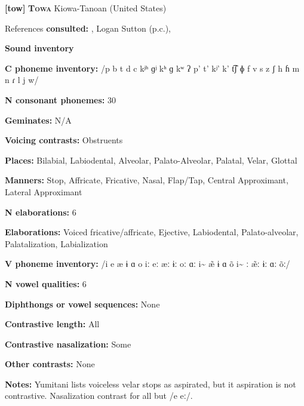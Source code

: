 \textbf{[tow]}   \textbf{\textsc{Towa}  }  Kiowa-Tanoan (United States)



References \textbf{consulted:} \citet{Bell1993}, Logan Sutton (p.c.), \citet{Yumitani1998}



\textbf{Sound inventory}



\textbf{C phoneme inventory:} /p b t d c kʲʰ ɡʲ kʰ ɡ kʷ ʔ p’ t’ kʲ’ k’ t͡ʃ ɸ f v s z ʃ h ɦ m n ɾ l j w/



\textbf{N consonant phonemes:} 30



\textbf{Geminates:} N/A



\textbf{Voicing contrasts:} Obstruents



\textbf{Places:} Bilabial, Labiodental, Alveolar, Palato-Alveolar, Palatal, Velar, Glottal



\textbf{Manners:} Stop, Affricate, Fricative, Nasal, Flap/Tap, Central Approximant, Lateral Approximant



\textbf{N elaborations:} 6



\textbf{Elaborations:} Voiced fricative/affricate, Ejective, Labiodental, Palato-alveolar, Palatalization, Labialization



\textbf{V phoneme inventory:} /i e æ ɨ ɑ o iː eː æː ɨː oː ɑː i\~{}  \~{æ} ɨ ɑ õ i\~{} ː \~{æ}ː ɨː ɑː õː/



\textbf{N vowel qualities:} 6



\textbf{Diphthongs or vowel sequences:} None



\textbf{Contrastive length:} All



\textbf{Contrastive nasalization:} Some



\textbf{Other contrasts:} None



\textbf{Notes:} Yumitani lists voiceless velar stops as aspirated, but it aspiration is not contrastive. Nasalization contrast for all but /e eː/.



